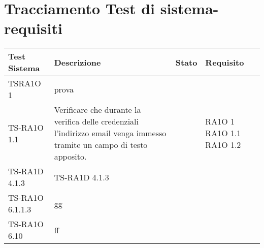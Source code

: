 
\section{Tracciamento Test di sistema-requisiti}

  \begin{center}
  \def\arraystretch{1.5}
  \bgroup
    \begin{longtable}{| p{3cm} | p{6cm} | p{1.5cm} | p{2cm} | }
    \hline 
     \textbf{Test Sistema} & \textbf{Descrizione} & \textbf{Stato} & \textbf{Requisito} \\ \hline
        TSRA1O 1 & 
        prova & 
         &  \\ \hline 
        TS-RA1O 1.1 & 
        Verificare che durante la verifica delle credenziali l'indirizzo email venga immesso tramite un campo di testo apposito. & 
         &        
            RA1O 1 \newline        
            RA1O 1.1 \newline        
            RA1O 1.2 \newline  \\ \hline 
        TS-RA1D 4.1.3 & 
        TS-RA1D 4.1.3 & 
         &  \\ \hline 
        TS-RA1O 6.1.1.3 & 
        gg & 
         &  \\ \hline 
        TS-RA1O 6.10 & 
        ff & 
         &  \\ \hline 
    \end{longtable}
   \egroup
\end{center}